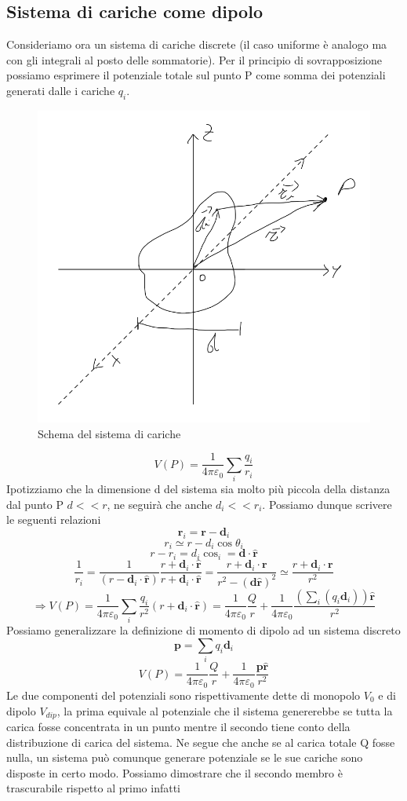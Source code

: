 \documentclass[
10pt, %
a4paper, %
oneside, %
headinclude,footinclude, %
BCOR5mm, %
]{scrartcl}
\begin{document}
\subsection{Sistema di cariche come dipolo}
Consideriamo ora un sistema di cariche discrete (il caso uniforme è analogo ma con gli integrali al posto delle sommatorie). Per il principio di sovrapposizione possiamo esprimere il potenziale totale sul punto P come somma dei potenziali generati dalle i cariche \(q_i\).
\begin{figure}[h!]
	\centering
	\includegraphics[width=0.5\linewidth]{images/sistema_dipolo}
	\caption{Schema del sistema di cariche}
	\label{fig:sistemadipolo}
\end{figure}
\FloatBarrier
\[V(P) = \frac{1}{4\pi\varepsilon_0}\sum_i \frac{q_i}{r_i}\]
Ipotizziamo che la dimensione d del sistema sia molto più piccola della distanza dal punto P \(d<<r\), ne seguirà che anche \(d_i<<r_i\). Possiamo dunque scrivere le seguenti relazioni
 \[\mathbf{r}_i = \mathbf{r} - \mathbf{d}_i\]
 \[r_i \simeq r-d_i\cos\theta_i\]
 \[r-r_i = d_i\cos_i = \mathbf{d}\cdot\hat{\mathbf{r}}\]
 \[\frac{1}{r_i} = \frac{1}{(r-\mathbf{d}_i\cdot\hat{\mathbf{r}})}\frac{r+\mathbf{d}_i\cdot\hat{\mathbf{r}}}{r+\mathbf{d}_i\cdot\hat{\mathbf{r}}} = \frac{r+\mathbf{d}_i\cdot\mathbf{r}}{r^2-(\mathbf{d}\hat{\mathbf{r}})^2} \simeq \frac{r+\mathbf{d}_i\cdot\mathbf{r}}{r^2}\]
 \[\Rightarrow V(P) =\frac{1}{4\pi\varepsilon_0}\sum_i \frac{q_i}{r^2}(r+\mathbf{d}_i\cdot\hat{\mathbf{r}}) = \frac{1}{4\pi\varepsilon_0}\frac{Q}{r}+\frac{1}{4\pi\varepsilon_0}\frac{(\sum_i(q_i\mathbf{d}_i))\hat{\mathbf{r}}}{r^2}\]
 Possiamo generalizzare la definizione di momento di dipolo ad un sistema discreto 
 \[\mathbf{p} = \sum_i q_i\mathbf{d}_i\]
 \[V(P) = \frac{1}{4\pi\varepsilon_0}\frac{Q}{r}+\frac{1}{4\pi\varepsilon_0}\frac{\mathbf{p}\hat{\mathbf{r}}}{r^2}\]
 Le due componenti del potenziali sono rispettivamente dette di monopolo \(V_0\) e di dipolo \(V_{dip}\), la prima equivale al potenziale che il sistema genererebbe se tutta la carica fosse concentrata in un punto mentre il secondo tiene conto della distribuzione di carica del sistema. Ne segue che anche se al carica totale Q fosse nulla, un sistema può comunque generare potenziale se le sue cariche sono disposte in certo modo. Possiamo dimostrare che il secondo membro è trascurabile rispetto al primo infatti
\end{document}
